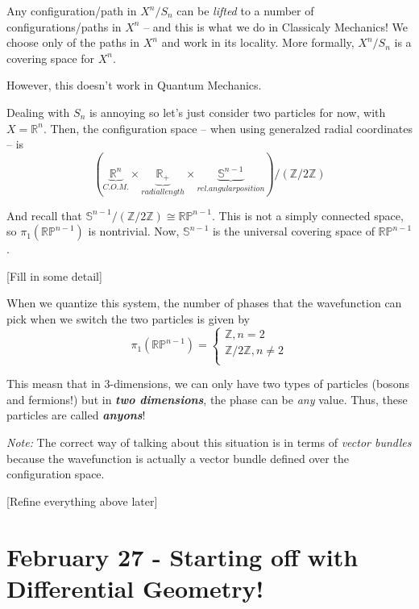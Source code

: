\documentclass{article}
\newcommand{\R}{\mathbb{R}}
\begin{document}
\vskip 0.5cm
Any configuration/path in $X^n / S_n$ can be \emph{lifted} to a number of configurations/paths in $X^n$ -- and this is what we do in Classicaly Mechanics! We choose only of the paths in $X^n$ and work in its locality. More formally, $X^n / S_n$ is a covering space for $X^n$.

\vskip 0.5cm
However, this doesn't work in Quantum Mechanics.

\vskip 0.5cm
Dealing with $S_n$ is annoying so let's just consider two particles for now, with $X = \R^n$. Then, the configuration space -- when using generalzed radial coordinates -- is 
\[ \left(\underbrace{\R^n}_{C.O.M.} \times \underbrace{\R_+}_{radial length} \times \underbrace{\mathbb{S}^{n-1}}_{rel. angular position}\right) / \left(\mathbb{Z}/2\mathbb{Z}\right) \]

And recall that $\mathbb{S}^{n-1} / \left(\mathbb{Z} / 2\mathbb{Z}\right)\cong \mathbb{RP}^{n-1}$. This is not a simply connected space, so $\pi_1\left(\mathbb{RP}^{n-1}\right)$ is nontrivial. Now, $\mathbb{S}^{n-1}$ is the universal covering space of $\mathbb{RP}^{n-1}$.

\vskip 0.5cm
[Fill in some detail]

\vskip 0.5cm
When we quantize this system, the number of phases that the wavefunction can pick when we switch the two particles is given by 
\[ \pi_1(\mathbb{RP}^{n-1}) = \begin{cases}
  \mathbb{Z}, n = 2 \\
  \mathbb{Z} / 2 \mathbb{Z}, n \neq 2 \\
\end{cases} \]

\vskip 0.5cm
This measn that in 3-dimensions, we can only have two types of particles (bosons and fermions!) but in \emph{\textbf{two dimensions}}, the phase can be \emph{any} value. Thus, these particles are called \emph{\textbf{anyons}}!

\vskip 0.5cm
\begin{dottedbox}
  \emph{Note:} The correct way of talking about this situation is in terms of \emph{vector bundles} because the wavefunction is actually a vector bundle defined over the configuration space.
\end{dottedbox}

[Refine everything above later]

\pagebreak

\section{February 27 - Starting off with Differential Geometry!}
\end{document}
